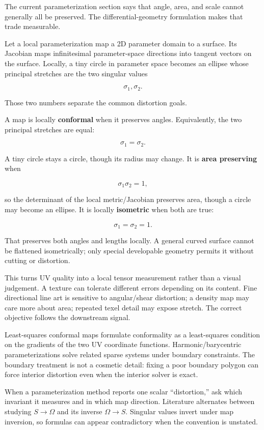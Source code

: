 \hypertarget{03-visual-computing-i-ch002-parameterization-distortion-is-a-singular-value-statement-about-the-surface-map}{}

The current parameterization section says that angle, area, and scale cannot generally all be preserved. The differential-geometry formulation makes that trade measurable.

Let a local parameterization map a 2D parameter domain to a surface. Its Jacobian maps infinitesimal parameter-space directions into tangent vectors on the surface. Locally, a tiny circle in parameter space becomes an ellipse whose principal stretches are the two singular values

\[
\sigma_1,\sigma_2.
\]

Those two numbers separate the common distortion goals.

A map is locally \textbf{conformal} when it preserves angles. Equivalently, the two principal stretches are equal:

\[
\sigma_1=\sigma_2.
\]

A tiny circle stays a circle, though its radius may change. It is \textbf{area preserving} when

\[
\sigma_1\sigma_2=1,
\]

so the determinant of the local metric/Jacobian preserves area, though a circle may become an ellipse. It is locally \textbf{isometric} when both are true:

\[
\sigma_1=\sigma_2=1.
\]

That preserves both angles and lengths locally. A general curved surface cannot be flattened isometrically; only special developable geometry permits it without cutting or distortion.

This turns UV quality into a local tensor measurement rather than a visual judgement. A texture can tolerate different errors depending on its content. Fine directional line art is sensitive to angular/shear distortion; a density map may care more about area; repeated texel detail may expose stretch. The correct objective follows the downstream signal.

Least-squares conformal maps formulate conformality as a least-squares condition on the gradients of the two UV coordinate functions. Harmonic/barycentric parameterizations solve related sparse systems under boundary constraints. The boundary treatment is not a cosmetic detail: fixing a poor boundary polygon can force interior distortion even when the interior solver is exact.

When a parameterization method reports one scalar ``distortion,'' ask which invariant it measures and in which map direction. Literature alternates between studying \(S\rightarrow\Omega\) and its inverse \(\Omega\rightarrow S\). Singular values invert under map inversion, so formulas can appear contradictory when the convention is unstated.

